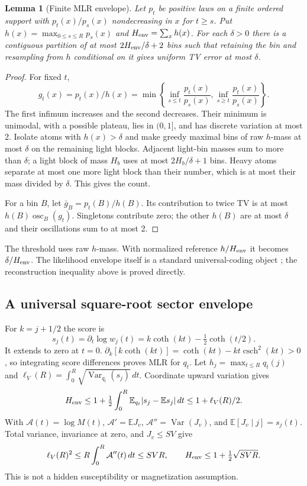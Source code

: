 \documentclass[11pt]{article}
\newtheorem{lemma}[theorem]{Lemma}
\theoremstyle{definition}
\DeclareMathOperator{\Var}{Var}
\DeclareMathOperator{\csch}{csch}
\newcommand{\E}{\mathbb E}
\begin{document}
\begin{lemma}[Finite MLR envelope]\label{lem:envelope}
Let $p_t$ be positive laws on a finite ordered support with
$p_t(x)/p_s(x)$ nondecreasing in $x$ for $t\ge s$.
Put $h(x)=\max_{0\le s\le R}p_s(x)$ and
$H_{\rm env}=\sum_xh(x)$.
For each $\delta>0$ there is a contiguous partition of at most
$2H_{\rm env}/\delta+2$ bins such that retaining the bin and
resampling from $h$ conditional on it gives uniform TV error at most
$\delta$.
\end{lemma}
\begin{proof}
For fixed $t$,
\[
 g_t(x)=p_t(x)/h(x)
 =\min\left\{\inf_{s\le t}\frac{p_t(x)}{p_s(x)},
 \inf_{s\ge t}\frac{p_t(x)}{p_s(x)}\right\}.
\]
The first infimum increases and the second decreases. Their minimum is
unimodal, with a possible plateau, lies in $(0,1]$, and has discrete
variation at most 2.
Isolate atoms with $h(x)>\delta$ and make greedy maximal bins of
raw $h$-mass at most $\delta$ on the remaining light blocks.
Adjacent light-bin masses sum to more than $\delta$; a light block
of mass $H_b$ uses at most $2H_b/\delta+1$ bins. Heavy atoms
separate at most one more light block than their number, which is
at most their mass divided by $\delta$. This gives the count.

For a bin $B$, let $\bar g_B=p_t(B)/h(B)$. Its contribution to
twice TV is at most $h(B)\operatorname{osc}_B(g_t)$.
Singletons contribute zero; the other $h(B)$ are at most $\delta$
and their oscillations sum to at most 2.
\end{proof}

The threshold uses raw $h$-mass. With normalized reference
$h/H_{\rm env}$ it becomes $\delta/H_{\rm env}$.
The likelihood envelope itself is a standard universal-coding object
\cite{shtarkov}; the reconstruction inequality above is proved directly.

\subsection{A universal square-root sector envelope}
For $k=j+1/2$ the score is
\[
 s_j(t)=\partial_t\log w_j(t)
 =k\coth(kt)-\tfrac12\coth(t/2).
\]
It extends to zero at $t=0$.
$\partial_k[k\coth(kt)]=\coth(kt)-kt\csch^2(kt)>0$,
so integrating score differences proves MLR for $q_t$.
Let $h_j=\max_{t\le R}q_t(j)$ and
$\ell_V(R)=\int_0^R\sqrt{\Var_{q_t}(s_j)}\,dt$.
Coordinate upward variation gives
\[
 H_{\rm env}\le
 1+\tfrac12\int_0^R\E_{q_t}|s_j-\E s_j|\,dt
 \le1+\ell_V(R)/2.
\]
With $\mathcal A(t)=\log M(t)$,
$\mathcal A'=\E J_v$, $\mathcal A''=\Var(J_v)$,
and $\E[J_v\mid j]=s_j(t)$.
Total variance, invariance at zero, and $J_v\le SV$ give
\begin{equation}\label{eq:fisher}
 \ell_V(R)^2\le R\int_0^R\mathcal A''(t)\,dt\le SVR,\qquad
 H_{\rm env}\le1+\tfrac12\sqrt{SVR}.
\end{equation}
This is not a hidden susceptibility or magnetization assumption.
\end{document}
